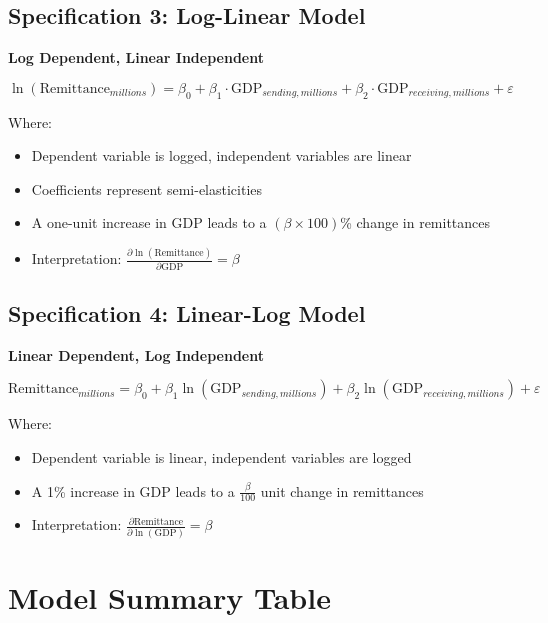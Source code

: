 \documentclass{article}
\begin{document}
\subsection{Specification 3: Log-Linear Model}
\textbf{Log Dependent, Linear Independent}

\begin{equation}
\ln(\text{Remittance}_{millions}) = \beta_0 + \beta_1 \cdot \text{GDP}_{sending,millions} + \beta_2 \cdot \text{GDP}_{receiving,millions} + \varepsilon
\end{equation}

Where:
\begin{itemize}
    \item Dependent variable is logged, independent variables are linear
    \item Coefficients represent semi-elasticities
    \item A one-unit increase in GDP leads to a $(\beta \times 100)$\% change in remittances
    \item Interpretation: $\frac{\partial \ln(\text{Remittance})}{\partial \text{GDP}} = \beta$
\end{itemize}

\subsection{Specification 4: Linear-Log Model}
\textbf{Linear Dependent, Log Independent}

\begin{equation}
\text{Remittance}_{millions} = \beta_0 + \beta_1 \ln(\text{GDP}_{sending,millions}) + \beta_2 \ln(\text{GDP}_{receiving,millions}) + \varepsilon
\end{equation}

Where:
\begin{itemize}
    \item Dependent variable is linear, independent variables are logged
    \item A 1\% increase in GDP leads to a $\frac{\beta}{100}$ unit change in remittances
    \item Interpretation: $\frac{\partial \text{Remittance}}{\partial \ln(\text{GDP})} = \beta$
\end{itemize}

\section{Model Summary Table}
\end{document}
